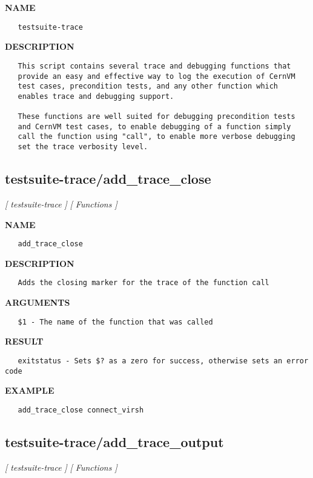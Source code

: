 \label{ch:robo35}
\label{ch:test_suite_testsuite_trace}
\textbf{NAME}
\begin{verbatim}
   testsuite-trace
\end{verbatim}
\textbf{DESCRIPTION}
\begin{verbatim}
   This script contains several trace and debugging functions that
   provide an easy and effective way to log the execution of CernVM
   test cases, precondition tests, and any other function which
   enables trace and debugging support.

   These functions are well suited for debugging precondition tests
   and CernVM test cases, to enable debugging of a function simply
   call the function using "call", to enable more verbose debugging
   set the trace verbosity level.
\end{verbatim}
\newpage
\subsection{testsuite-trace/add\_trace\_close}
\textsl{[ testsuite-trace ]}
\textsl{[ Functions ]}

\label{ch:robo38}
\label{ch:testsuite_trace_add_trace_close}
\textbf{NAME}
\begin{verbatim}
   add_trace_close
\end{verbatim}
\textbf{DESCRIPTION}
\begin{verbatim}
   Adds the closing marker for the trace of the function call
\end{verbatim}
\textbf{ARGUMENTS}
\begin{verbatim}
   $1 - The name of the function that was called
\end{verbatim}
\textbf{RESULT}
\begin{verbatim}
   exitstatus - Sets $? as a zero for success, otherwise sets an error code
\end{verbatim}
\textbf{EXAMPLE}
\begin{verbatim}
   add_trace_close connect_virsh
\end{verbatim}
\newpage
\subsection{testsuite-trace/add\_trace\_output}
\textsl{[ testsuite-trace ]}
\textsl{[ Functions ]}

